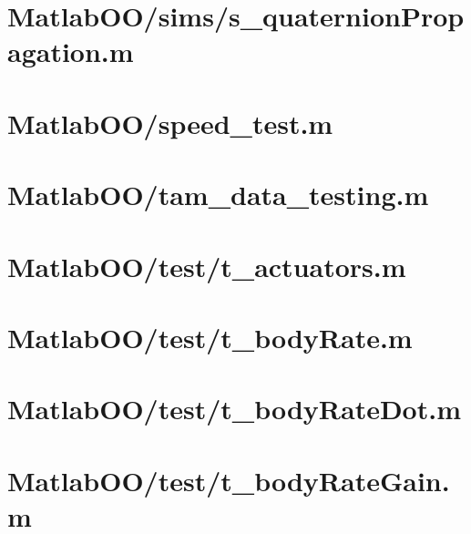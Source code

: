 \pagebreak
\section{MatlabOO/sims/s\_quaternionPropagation.m}\label{code:MatlabOO/sims/s_quaternionPropagation.m}


\pagebreak
\section{MatlabOO/speed\_test.m}\label{code:MatlabOO/speed_test.m}


\pagebreak
\section{MatlabOO/tam\_data\_testing.m}\label{code:MatlabOO/tam_data_testing.m}


\pagebreak
\section{MatlabOO/test/t\_actuators.m}\label{code:MatlabOO/test/t_actuators.m}


\pagebreak
\section{MatlabOO/test/t\_bodyRate.m}\label{code:MatlabOO/test/t_bodyRate.m}


\pagebreak
\section{MatlabOO/test/t\_bodyRateDot.m}\label{code:MatlabOO/test/t_bodyRateDot.m}


\pagebreak
\section{MatlabOO/test/t\_bodyRateGain.m}\label{code:MatlabOO/test/t_bodyRateGain.m}


